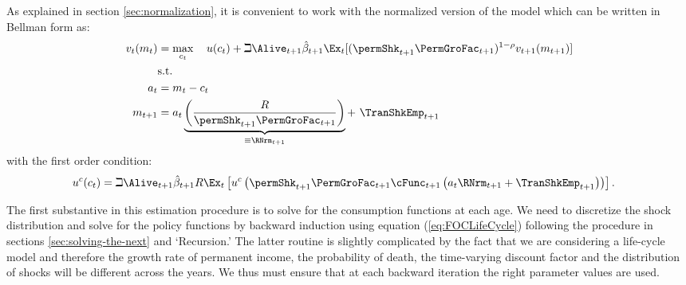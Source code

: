 As explained in section \ref{sec:normalization}, it is convenient to work with the normalized version of the model which can be written in Bellman form as:
  \begin{equation*}\begin{gathered}\begin{aligned}
        {v}_{t}({m}_{t})  & = \max_{{c}_{t}}~~~ u({c}_{t})+\beth\Alive_{t+1}\hat{\beta}_{t+1}
        \Ex_{t}[(\permShk_{t+1}\PermGroFac_{t+1})^{1-\rho}{v}_{t+1}({m}_{t+1})]   \\
        & \text{s.t.}   \nonumber \\
        {a}_{t}    & = {m}_{t}-{c}_{t} \nonumber
        \\      {m}_{t+1}  & = {a}_{t}\underbrace{\left(\frac{R}{\permShk_{t+1}\PermGroFac_{t+1}}\right)}_{\equiv \RNrm_{t+1}}+ ~\TranShkEmp_{t+1}
      \end{aligned}\end{gathered}\end{equation*}
with the first order condition:
  \begin{equation}\begin{gathered}\begin{aligned}
        u^{{c}}({c}_{t}) & = \beth\Alive_{t+1}\hat{\beta}_{t+1}R \Ex_{t}\left[u^{{c}}\left(\permShk_{t+1}\PermGroFac_{t+1}\cFunc_{t+1}\left({a}_{t}\RNrm_{t+1}+\TranShkEmp_{t+1}\right)\right)\right]\label{eq:FOCLifeCycle}
        .
      \end{aligned}\end{gathered}\end{equation}

The first substantive {\move} in this estimation procedure is
to solve for the consumption functions at each age. We need to
discretize the shock distribution and solve for the policy
functions by backward induction using equation (\ref{eq:FOCLifeCycle})
following the procedure in sections \ref{sec:solving-the-next} and
`Recursion.' The latter routine
is slightly complicated by the fact that we are considering a
life-cycle model and therefore the growth rate of permanent income,
the probability of death, the time-varying discount factor and the
distribution of shocks will be different across the years. We thus
must ensure that at each backward iteration the right parameter
values are used.

